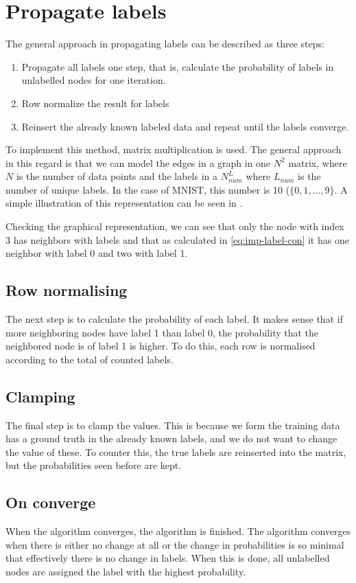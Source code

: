 \section{Propagate labels}
The general approach in propagating labels can be described as three steps:

\begin{enumerate}[label=Step \arabic*:]
    \item Propagate all labels one step, that is, calculate the probability of labels in unlabelled nodes for one iteration.
    \item Row normalize the result for labels
    \item Reinsert the already known labeled data and repeat until the labels converge.
\end{enumerate}
To implement this method, matrix multiplication is used. The general approach in this regard is that we can model the edges in a graph in one $N^2$ matrix, where $N$ is the number of data points and the labels in a $N^L_{num}$ where $L_{num}$ is the number of unique labels. In the case of MNIST, this number is 10 ($\{0,1,...,9\}$. A simple illustration of this representation can be seen in .


Checking the graphical representation, we can see that only the node with index 3 has neighbors with labels and that as calculated in \cref{eq:imp-label-con} it has one neighbor with label 0 and two with label 1.

\subsection{Row normalising}
The next step is to calculate the probability of each label. It makes sense that if more neighboring nodes have label 1 than label 0, the probability that the neighbored node is of label 1 is higher. To do this, each row is normalised according to the total of counted labels.

\subsection{Clamping}
The final step is to clamp the values. This is because we form the training data has a ground truth in the already known labels, and we do not want to change the value of these. To counter this, the true labels are reinserted into the matrix, but the probabilities seen before are kept.

\subsection{On converge}
When the algorithm converges, the algorithm is finished. The algorithm converges when there is either no change at all or the change in probabilities is so minimal that effectively there is no change in labels. When this is done, all unlabelled nodes are assigned the label with the highest probability.

